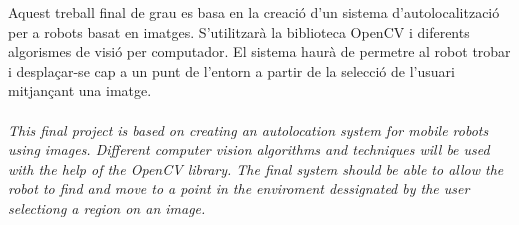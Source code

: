 	Aquest treball final de grau es basa en la creació d'un sistema d'autolocalització per a robots basat en imatges. S'utilitzarà la biblioteca OpenCV i diferents algorismes de visió per computador.
	El sistema haurà de permetre al robot trobar i desplaçar-se cap a un punt de l'entorn a partir de la selecció de l'usuari mitjançant una imatge.\\\\
	\textit{This final project is based on creating an autolocation system for mobile robots using images. Different computer vision algorithms and techniques will be used with the help of
	the OpenCV library. The final system should be able to allow the robot to find and move to a point in the enviroment dessignated by the user selectiong a region on an image.}
